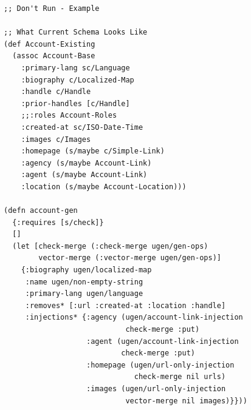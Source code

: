 \documentclass[11pt]{article}
\begin{document}
\begin{verbatim}
;; Don't Run - Example

;; What Current Schema Looks Like
(def Account-Existing
  (assoc Account-Base
    :primary-lang sc/Language
    :biography c/Localized-Map
    :handle c/Handle
    :prior-handles [c/Handle]
    ;;:roles Account-Roles
    :created-at sc/ISO-Date-Time
    :images c/Images
    :homepage (s/maybe c/Simple-Link)
    :agency (s/maybe Account-Link)
    :agent (s/maybe Account-Link)
    :location (s/maybe Account-Location)))

(defn account-gen
  {:requires [s/check]}
  []
  (let [check-merge (:check-merge ugen/gen-ops)
        vector-merge (:vector-merge ugen/gen-ops)]
    {:biography ugen/localized-map
     :name ugen/non-empty-string
     :primary-lang ugen/language
     :removes* [:url :created-at :location :handle]
     :injections* {:agency (ugen/account-link-injection
                            check-merge :put)
                   :agent (ugen/account-link-injection
                           check-merge :put)
                   :homepage (ugen/url-only-injection
                              check-merge nil urls)
                   :images (ugen/url-only-injection
                            vector-merge nil images)}}))
\end{verbatim}
\end{document}

